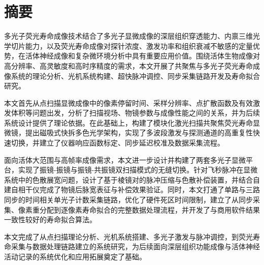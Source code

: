 
\maketitle%
\MAKETITLE%
\makedeclaration%
\pagestyle{frontmatterstyle}%
\intobmk\chapter*{摘\quad 要}%
\thispagestyle{frontmatterstyle}%
\setcounter{page}{1}%

多光子荧光寿命成像技术结合了多光子显微成像的深层组织穿透能力、内禀三维光学切片能力，以及荧光寿命成像对探针浓度、激发功率和组织衰减不敏感的定量优势，在活体神经成像和复杂微环境分析中具有重要应用价值。围绕活体生物成像对高分辨率、高灵敏度和高时序精度的需求，本文开展了共聚焦与多光子荧光寿命成像系统的理论分析、光机系统构建、超快脉冲调控、同步采集链路开发及寿命拟合研究。

本文首先从点扫描显微成像中的像素停留时间、采样分辨率、点扩散函数及有效激发体积等问题出发，分析了扫描视场、物镜参数与成像性能之间的关系，并为后续系统设计提供了理论依据。在此基础上，构建了模块化激光扫描共聚焦荧光寿命显微镜，提出磁吸式快拆多色光学架构，实现了多波段激发与探测通道的高重复性快速切换，并建立了仪器响应函数标定、同步延迟校准及数据采集流程。

面向活体大范围与高帧率成像需求，本文进一步设计并构建了两套多光子显微平台，实现了振镜-振镜与振镜-共振镜双扫描模式的无缝切换。针对飞秒脉冲在显微系统中的色散展宽问题，设计了基于棱镜对的脉冲压缩与色散补偿装置，并结合自建自相干仪完成了物镜后脉宽表征与补偿效果验证。同时，本文打通了单路与三路同步的时间相关单光子计数采集链路，优化了硬件死区时间限制，建立了从同步采集、像素重分配到逐像素寿命拟合的完整数据处理流程，并开发了与商用软件结果一致性较好的寿命拟合算法。

本文完成了从点扫描理论分析、光机系统搭建、多光子激发与脉冲调控，到荧光寿命采集与数据处理链路建立的系统研究，为后续面向深层组织功能成像与活体神经活动记录的系统优化和应用拓展奠定了基础。

